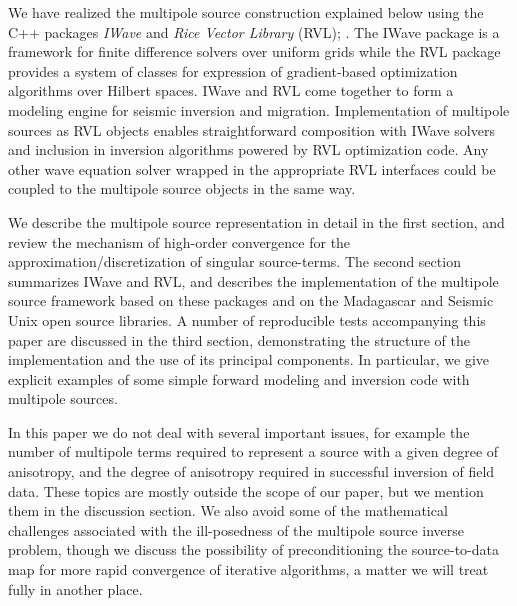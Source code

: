
We have realized the multipole source construction explained below using the C++ packages \emph{IWave} and \emph{Rice Vector Library} (RVL); \citep{GeoPros:11,RVL_TOMS}.  
The IWave package is a framework for finite difference solvers over uniform grids while the RVL package provides a system of classes for expression of gradient-based optimization algorithms over Hilbert spaces.  
IWave and RVL come together to form a modeling engine for seismic inversion and migration. 
Implementation of multipole sources as RVL objects enables straightforward composition with IWave solvers and inclusion in inversion algorithms powered by RVL optimization code. 
Any other wave equation solver wrapped in the appropriate RVL interfaces could be coupled to the multipole source objects in the same way.

We describe the multipole source representation in detail in the first section, and review the mechanism of high-order convergence for the approximation/discretization of singular source-terms.  
The second section summarizes IWave and RVL, and describes the implementation of the multipole source framework based on these packages and on the Madagascar and Seismic Unix open source libraries.  
A number of reproducible tests accompanying this paper are discussed in the third section, demonstrating the structure of the implementation and the use of its principal components.
In particular, we give explicit examples of some simple forward modeling and inversion code with multipole sources.

In this paper we do not deal with several important issues, for example the number of multipole terms required to represent a source with a given degree of anisotropy, and the degree of anisotropy required in successful inversion of field data.  
These topics are mostly outside the scope of our paper, but we mention them in the discussion section.
We also avoid some of the mathematical challenges associated with the ill-posedness of the multipole source inverse problem, though we discuss the possibility of preconditioning the source-to-data map for more rapid convergence of iterative algorithms, a matter we will treat fully in another place.


